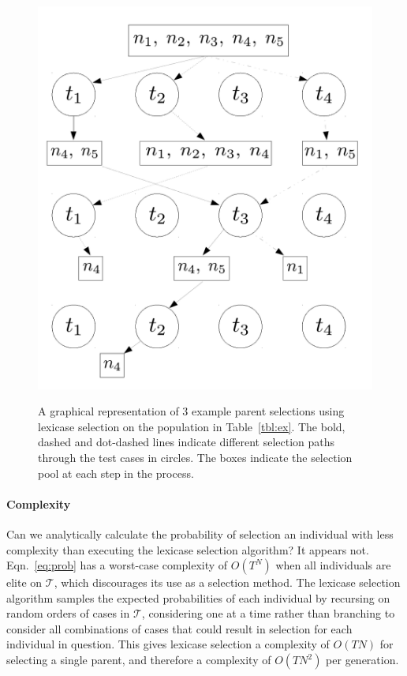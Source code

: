 \documentclass[preprint]{article}
\begin{document}
\begin{figure}
\centering
  \includegraphics[height = 0.4\textheight]{figs/lex_graph.pdf}\\
  \caption{A graphical representation of 3 example parent selections using lexicase selection on the population in Table~\ref{tbl:ex}. The bold, dashed and dot-dashed lines indicate different selection paths through the test cases in circles. The boxes indicate the selection pool at each step in the process.}\label{fig:boxplot_eps_e}
\end{figure}

\paragraph{Complexity}
Can we analytically calculate the probability of selection an individual with less complexity than executing the lexicase selection algorithm? It appears not. Eqn.~\ref{eq:prob} has a worst-case complexity of $O(T^N)$ when all individuals are elite on $\mathcal{T}$, which discourages its use as a selection method. The lexicase selection algorithm samples the expected probabilities of each individual by recursing on random orders of cases in $\mathcal{T}$, considering one at a time rather than branching to consider all combinations of cases that could result in selection for each individual in question. This gives lexicase selection a complexity of $O(TN)$ for selecting a single parent, and therefore a complexity of $O(TN^2)$ per generation. 
\end{document}
